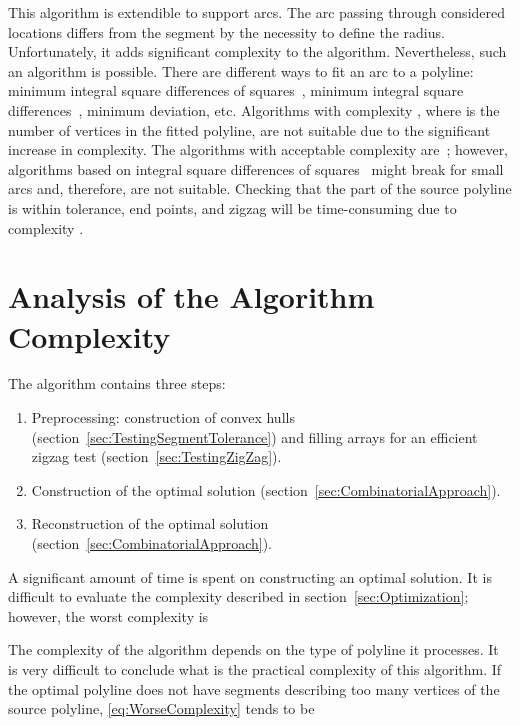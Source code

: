 \documentclass[conference]{IEEEtran}
\begin{document}
This algorithm is extendible to support arcs. The arc passing through considered locations differs from the segment by the necessity to define the radius. Unfortunately, it adds significant complexity to the algorithm. Nevertheless, such an algorithm is possible. There are different ways to fit an arc to a polyline: minimum integral square differences of squares~\cite{ThomasReference2, IchokuReference3}, minimum integral square differences~\cite{RobinsonReference6, Landau4, PaperArcFitting, FittingOfCircularArcsWithO1Complexity, EfficientFittingOfCircularArcs}, minimum deviation, etc. Algorithms with complexity , where  is the number of vertices in the fitted polyline, are not suitable due to the significant increase in complexity. The algorithms with acceptable complexity  are~\cite{ThomasReference2, IchokuReference3, FittingOfCircularArcsWithO1Complexity, EfficientFittingOfCircularArcs}; however, algorithms based on integral square differences of squares~\cite{ThomasReference2, IchokuReference3} might break for small arcs and, therefore, are not suitable. Checking that the part of the source polyline is within tolerance, end points, and zigzag will be time-consuming due to complexity .

\section{Analysis of the Algorithm Complexity}

The algorithm contains three steps:
\begin{enumerate}[label={\arabic*.}]
  \item Preprocessing: construction of convex hulls (section~\ref{sec:TestingSegmentTolerance}) and filling arrays for an efficient zigzag test (section~\ref{sec:TestingZigZag}).
  \item Construction of the optimal solution (section~\ref{sec:CombinatorialApproach}).
  \item Reconstruction of the optimal solution (section~\ref{sec:CombinatorialApproach}).
\end{enumerate}

A significant amount of time is spent on constructing an optimal solution. It is difficult to evaluate the complexity described in section~\ref{sec:Optimization}; however, the worst complexity is


The complexity of the algorithm depends on the type of polyline it processes. It is very difficult to conclude what is the practical complexity of this algorithm. If the optimal polyline does not have segments describing too many vertices of the source polyline, \eqref{eq:WorseComplexity} tends to be
\end{document}
